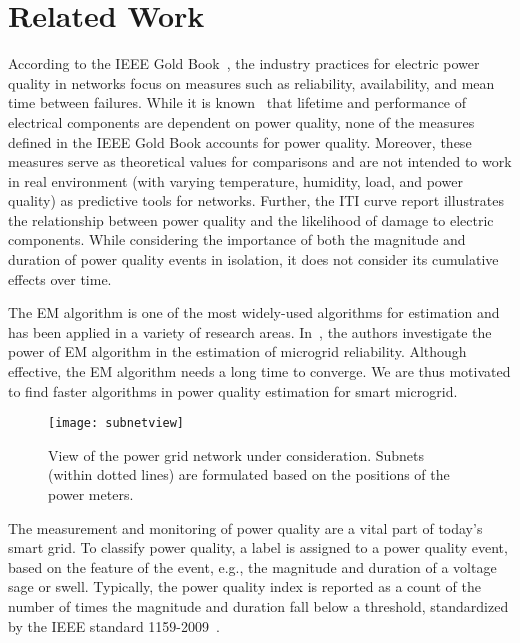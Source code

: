 \section{Related Work}
According to the IEEE Gold Book~\cite{goldbook}, the industry practices for electric power quality in networks focus on measures such as reliability, availability, and mean time between failures. While it is known~\cite{iti_curve} that lifetime and performance of electrical components are dependent on power quality, none of the measures defined in the IEEE Gold Book accounts for power quality. Moreover, these measures serve as theoretical values for comparisons and are not intended to work in real environment (with varying temperature, humidity, load, and power quality) as predictive tools for networks. Further, the ITI curve report illustrates the relationship between power quality and the likelihood of damage to electric components. While considering the importance of both the magnitude and duration of power quality events in isolation, it does not consider its cumulative effects over time.

The EM algorithm is one of the most widely-used algorithms for estimation and has been applied in a variety of research areas.
 In~\cite{catherine_pri}, the authors investigate the power of EM algorithm in the estimation of microgrid reliability. Although effective, the EM algorithm needs a long time to converge. We are thus motivated to find faster algorithms in power quality estimation for smart microgrid.

\begin{landscape}
\begin{figure}[!p]
    \centering
    \texttt{[image: subnetview]}
    \vspace{0.5cm}    
    \caption{View of the power grid network under consideration. Subnets (within dotted lines) are formulated based on the positions of the power meters.}
    \vspace{1.5cm}
    \label{fig:subnetview}
\end{figure}
\end{landscape}

The measurement and monitoring of power quality are a vital part of today's smart grid. To classify power quality, a label is assigned to a power quality event, based on the feature of the event, e.g., the magnitude and duration of a voltage sage or swell. Typically, the power quality index is reported as a count of the number of times the magnitude and duration fall below a threshold, standardized by the IEEE standard 1159-2009~\cite{IEEE09_1159}.


